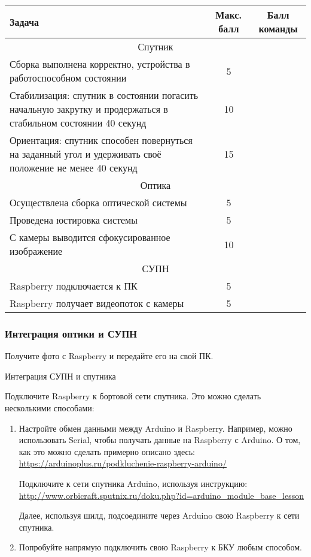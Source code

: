 \begin{table}[H]
    \center
    \begin{tabular}{|p{10cm}|c|c|}
        \hline
        Задача	&Макс. балл	&Балл команды \\
        \hline
        \multicolumn{3}{|c|}{Спутник} \\
        \hline
        Сборка выполнена корректно, устройства в работоспособном состоянии	&5	& \\
        \hline
        Стабилизация: спутник в состоянии погасить начальную закрутку и продержаться в стабильном состоянии 40 секунд	&10	& \\
        \hline
        Ориентация: спутник способен повернуться на заданный угол и удерживать своё положение не менее 40 секунд&	15	& \\
        \hline
        \multicolumn{3}{|c|}{Оптика} \\
        \hline
        Осуществлена сборка оптической системы&	5	& \\
        \hline
        Проведена юстировка системы	&5&	 \\
        \hline
        С камеры выводится сфокусированное изображение&	10	& \\
        \hline
        \multicolumn{3}{|c|}{СУПН} \\
        \hline
        Raspberry подключается к ПК	&5	& \\
        \hline
        Raspberry получает видеопоток с камеры	&5	& \\
        \hline
    \end{tabular}
\end{table}

\subsubsection*{Интеграция оптики и СУПН}

Получите фото с Raspberry и передайте его на свой ПК.

Интеграция СУПН и спутника

Подключите Raspberry к бортовой сети спутника. Это можно сделать несколькими способами:
\begin{enumerate}
    \item Настройте обмен данными между Arduino и Raspberry. Например, можно использовать Serial, чтобы получать данные на Raspberry с Arduino. О том, как это можно сделать примерно описано здесь: \url{https://arduinoplus.ru/podkluchenie-raspberry-arduino/}
    
    Подключите к сети спутника Arduino, используя инструкцию: \url{http://www.orbicraft.sputnix.ru/doku.php?id=arduino_module_base_lesson}

    Далее, используя шилд, подсоедините через Arduino свою Raspberry к сети спутника.
    \item  Попробуйте напрямую подключить свою Raspberry к БКУ любым способом.
\end{enumerate}

